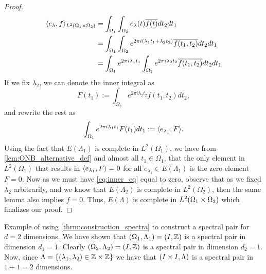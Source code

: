 \documentclass[../thesis.tex]{subfiles}
\begin{document}
\begin{proof}
    \begin{align*} %
        \braa{e_\lambda,f}_{L^2\brac{\Omega_1 \times \Omega_2}} 
        &= \int_{\Omega_1} \int_{\Omega_2} e_\lambda(t) \overline{f(t)} dt_2dt_1 \\   
        &= \int_{\Omega_1} \int_{\Omega_2} e^{2\pi i  (\lambda_1 t_1 + \lambda_2 t_2)} \overline{f(t_1,t_2)} dt_2 dt_1 \\
        &= \int_{\Omega_1} e^{2 \pi i \lambda_1 t_1} \int_{\Omega_2}e^{2 \pi i \lambda_2 t_2} \overline{f(t_1,t_2)} dt_2 dt_1  \\
    \end{align*}
    If we fix $\lambda_2$, we can denote the inner integral as 
    \begin{equation}\label{eq:inner_eq}
        F(t_1) := \int_{\Omega_2} e^{2 \pi i \lambda_2 t_2} \overline{f(t_1,t_2)} dt_2,
    \end{equation}
    and rewrite the rest as
    \begin{equation}\label{eq:outter_eq}
        \int_{\Omega_1} e^{2 \pi i \lambda_1 t_1} F(t_1) dt_1 := \langle e_{\lambda_1}, F\rangle.
    \end{equation}
    Using the fact that $E(\Lambda_1)$ is complete in $L^2(\Omega_1)$, we have from \cref{lem:ONB_alternative_def} and almost all $t_1 \in \Omega_1$, that the only element in $L^2(\Omega_1)$ that results in $\langle e_{\lambda_1}, F\rangle = 0$ for all $e_{\lambda_1} \in E(\Lambda_1)$ is the zero-element $F=0$. Now as we must have \cref{eq:inner_eq} equal to zero, observe that as we fixed $\lambda_2$ arbitrarily, and we know that $E(\Lambda_2)$ is complete in $L^2(\Omega_2)$, then the same lemma also implies $f=0$. Thus, $E(\Lambda)$ is complete in $L^2(\Omega_1 \times \Omega_2)$ which finalizes our proof.
\end{proof}


\begin{example}
    Example of using \cref{thrm:construction_spectra} to construct a spectral pair for $d=2$ dimensions. 
    We have shown that $(\Omega_1,\Lambda_1) = (I, \mathbb{Z})$ is a spectral pair in dimension $d_1=1$. Clearly $(\Omega_2,\Lambda_2) = (I, \mathbb{Z})$ is a spectral pair in dimension $d_2=1$. Now, since $\Lambda  = \{(\lambda_1,\lambda_2)\in \mathbb{Z} \times \mathbb{Z} \}$ we have that $(I \times I, \Lambda)$ is a spectral pair in $1+1=2$ dimensions.

    
\end{example}
\end{document}

